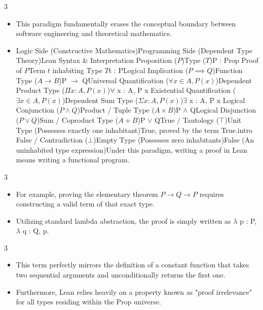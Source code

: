 \documentclass[10pt]{beamer}
\begin{document}
\begin{frame}{3}
\begin{itemize}\setlength{\itemsep}{1.5em}
  \item This paradigm fundamentally erases the conceptual boundary between software engineering and theoretical mathematics.
  \item Logic Side (Constructive Mathematics)Programming Side (Dependent Type Theory)Lean Syntax \& Interpretation Proposition ($P$)Type ($T$)P : Prop Proof of $P$Term $t$ inhabiting Type $T$t : PLogical Implication ($P \implies Q$)Function Type ($A \to B$)P $\to$ QUniversal Quantification ($\forall x \in A, P(x)$)Dependent Product Type ($\Pi x: A, P(x)$)$\forall$ x : A, P x Existential Quantification ($\exists x \in A, P(x)$)Dependent Sum Type ($\Sigma x: A, P(x)$)$\exists$ x : A, P x Logical Conjunction ($P \land Q$)Product / Tuple Type ($A \times B$)P $\land$ QLogical Disjunction ($P \lor Q$)Sum / Coproduct Type ($A + B$)P $\lor$ QTrue / Tautology ($\top$)Unit Type (Possesses exactly one inhabitant)True, proved by the term True.intro False / Contradiction ($\bot$)Empty Type (Possesses zero inhabitants)False (An uninhabited type expression)Under this paradigm, writing a proof in Lean means writing a functional program.
\end{itemize}
\end{frame}

\begin{frame}{3}
\begin{itemize}\setlength{\itemsep}{1.5em}
  \item For example, proving the elementary theorem $P \to Q \to P$ requires constructing a valid term of that exact type.
  \item Utilizing standard lambda abstraction, the proof is simply written as $\lambda$ p : P, $\lambda$ q : Q, p.
\end{itemize}
\end{frame}

\begin{frame}{3}
\begin{itemize}\setlength{\itemsep}{1.5em}
  \item This term perfectly mirrors the definition of a constant function that takes two sequential arguments and unconditionally returns the first one.
  \item Furthermore, Lean relies heavily on a property known as "proof irrelevance" for all types residing within the Prop universe.
\end{itemize}
\end{frame}
\end{document}
